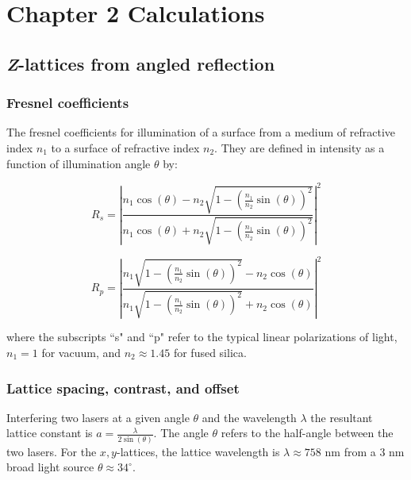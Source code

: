 


\chapter{Chapter 2 Calculations}
\label{appendix:Ch2Cal}

\newpage{}

\section{\emph{Z}-lattices from angled reflection}

\subsection{Fresnel coefficients}

The fresnel coefficients for illumination of a surface from a medium of refractive index $n_1$ to a surface of refractive index $n_2$. They are defined in intensity as a function of illumination angle $\theta$ by: 

\begin{equation}
\label{eqn:Rs}
R_s = \left | \frac{n_1\cos(\theta) - n_2 \sqrt{1-\left ( \frac{n_1}{n_2} \sin ( \theta) \right )^2}}{n_1 \cos(\theta) + n_2 \sqrt{1-\left ( \frac{n_1}{n_2} \sin(\theta) \right )^2}} \right |^2
\end{equation}

\begin{equation}
\label{eqn:Rp}
R_p = \left | \frac{n_1 \sqrt{1-\left ( \frac{n_1}{n_2} \sin ( \theta) \right )^2}-n_2 \cos (\theta)}{n_1 \sqrt{1-\left ( \frac{n_1}{n_2} \sin(\theta) \right )^2}+n_2 \cos(\theta)} \right |^2
\end{equation}

where the subscripts ``s" and ``p" refer to the typical linear polarizations of light, $n_1=1$ for vacuum, and $n_2\approx 1.45$ for fused silica. 

\subsection{Lattice spacing, contrast, and offset}

Interfering two lasers at a given angle $\theta$ and the wavelength $\lambda$ the resultant lattice constant is $a=\frac{\lambda}{2 \sin (\theta)}$. The angle $\theta$ refers to the half-angle between the two lasers. For the $x,y$-lattices, the lattice wavelength is $\lambda\approx 758$ nm from a $3$ nm broad light source $\theta \approx 34^\circ$.

